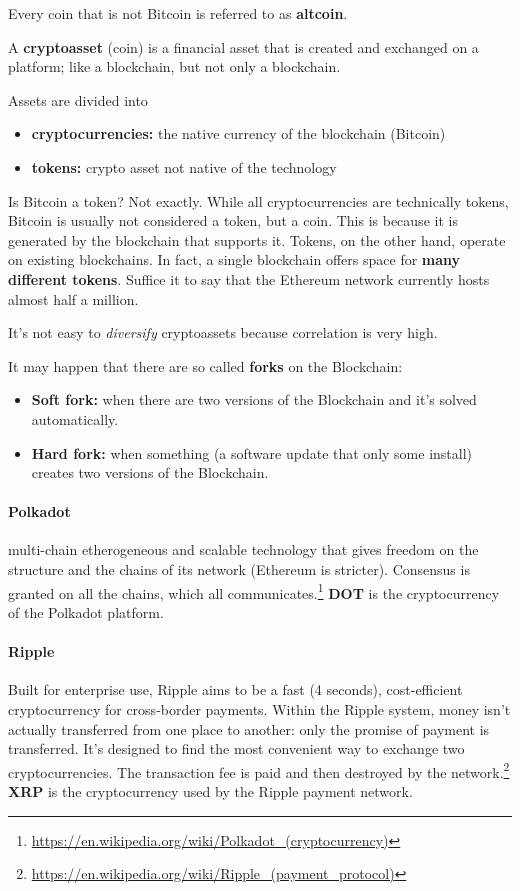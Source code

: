 Every coin that is not Bitcoin is referred to as \textbf{altcoin}.

A \textbf{cryptoasset} (coin) is a financial asset that is created and exchanged on a platform; like a blockchain, but not only a blockchain.

Assets are divided into
\begin{itemize}
	\item \textbf{cryptocurrencies:} the native currency of the blockchain (Bitcoin)
	\item \textbf{tokens:} crypto asset not native of the technology
\end{itemize}

Is Bitcoin a token? Not exactly. While all cryptocurrencies are technically tokens, Bitcoin is usually not considered a token, but a coin. This is because it is generated by the blockchain that supports it. Tokens, on the other hand, operate on existing blockchains. In fact, a single blockchain offers space for \textbf{many different tokens}. Suffice it to say that the Ethereum network currently hosts almost half a million.

It's not easy to \textit{diversify} cryptoassets because correlation is very high.

It may happen that there are so called \textbf{forks} on the Blockchain:
\begin{itemize}
	\item \textbf{Soft fork:} when there are two versions of the Blockchain and it's solved automatically.
	\item \textbf{Hard fork:} when something (a software update that only some install) creates two versions of the Blockchain.
\end{itemize}

\paragraph{Polkadot} multi-chain etherogeneous and scalable technology that gives freedom on the structure and the chains of its network (Ethereum is stricter). Consensus is granted on all the chains, which all communicates.\footnote{\url{https://en.wikipedia.org/wiki/Polkadot_(cryptocurrency)}}
\textbf{DOT} is the cryptocurrency of the Polkadot platform.

\paragraph{Ripple} Built for enterprise use, Ripple aims to be a fast (4 seconds), cost-efficient cryptocurrency for cross-border payments. Within the Ripple system, money isn't actually transferred from one place to another: only the promise of payment is transferred.
It's designed to find the most convenient way to exchange two cryptocurrencies. The transaction fee is paid and then destroyed by the network.\footnote{\url{https://en.wikipedia.org/wiki/Ripple_(payment_protocol)}}
\textbf{XRP} is the cryptocurrency used by the Ripple payment network.





